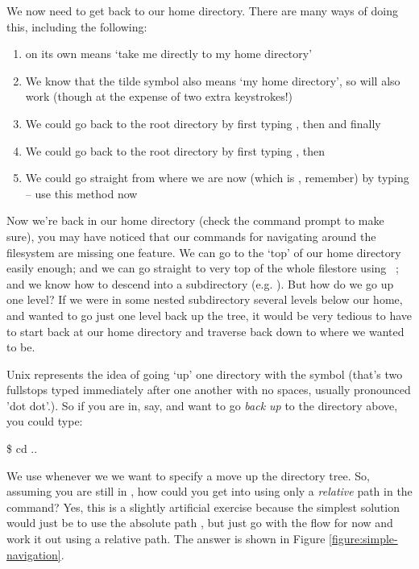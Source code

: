 We now need to get back to our home directory.  There are many ways of doing this, including the following:

\begin{enumerate}
\item {} on its own means `take me directly to my home directory'
\item We know that the tilde symbol also means `my home directory', so  will also work (though at the expense of two extra keystrokes!)
\item We could go back to the root directory by first typing , then  and finally 
\item We could go back to the root directory by first typing , then 
\item We could go straight from where we are now (which is , remember) by typing  -- use this method now
\end{enumerate}

Now we're back in our home directory (check the command prompt to make sure), you may have noticed that our commands for navigating around the filesystem are missing one feature. We can go to the `top' of our home directory easily enough; and we can go straight to very top of the whole filestore using ~; and we know how to descend into a subdirectory (e.g. ). But how do we go up one level? If we were in some nested subdirectory several levels below our home, and wanted to go just one level back up the tree, it would be very tedious to have to start back at our home directory and traverse back down to where we wanted to be.

Unix represents the idea of going `up' one directory with the  symbol (that's two fullstops typed immediately after one another with no spaces, usually pronounced 'dot dot'.). So if you are in, say,  and want to go \textit{back up} to the directory above, you could type:

\begin{ttoutenv}
\$ cd ..
\end{ttoutenv}

We use  whenever we we want to specify a move up the directory tree. So, assuming you are still in , how could you get into  using only a \textit{relative} path in the  command? Yes, this is a slightly artificial exercise because the simplest solution would just be to use the absolute path , but just go with the flow for now and work it out using a relative path. The answer is shown in Figure \ref{figure:simple-navigation}.

